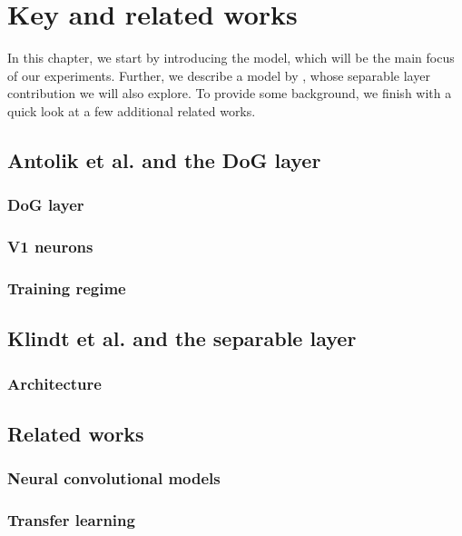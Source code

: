 \chapter{Key and related works}

In this chapter, we start by introducing the \cite{antolik} model, which will be the main focus of our experiments. Further, we describe a model by \cite{klidnt}, whose separable layer contribution we will also explore. To provide some background, we finish with a quick look at a few additional related works.

\section{Antolik et al. and the DoG layer}

\subsection{DoG layer}

\subsection{V1 neurons}

\subsection{Training regime}

\section{Klindt et al. and the separable layer}

\subsection{Architecture}

\section{Related works}

\subsection{Neural convolutional models}

\subsection{Transfer learning}
